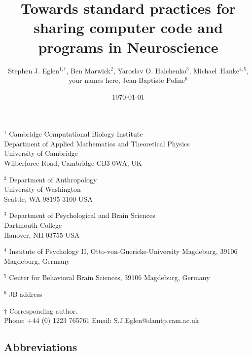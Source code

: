 \documentclass[11pt]{article}
\begin{document}
\doublespacing

\title{Towards standard practices for sharing computer code and programs in Neuroscience}

\author{Stephen J. Eglen$^{1,\dagger}$, Ben Marwick${^2}$, Yaroslav O. Halchenko${^3}$, Michael~Hanke${^{4,5}}$,\\ your names here, Jean-Baptiste Poline${^6}$}
\date{\today}
\maketitle

\noindent $^{1}$ 
Cambridge Computational Biology Institute\\
Department of Applied Mathematics and Theoretical Physics\\
University of Cambridge\\
Wilberforce Road, Cambridge CB3 0WA, UK
\vspace*{2mm}

\noindent $^{2}$ 
Department of Anthropology\\
University of Washington\\
Seattle, WA 98195-3100 USA 
\vspace*{2mm}

\noindent $^{3}$
Department of Psychological and Brain Sciences\\
Dartmouth College\\
Hanover, NH 03755 USA
\vspace*{2mm}

\noindent $^{4}$
Institute of Psychology II, Otto-von-Guericke-University Magdeburg, 39106 Magdeburg, Germany
\vspace*{2mm}

\noindent $^{5}$
Center for Behavioral Brain Sciences, 39106 Magdeburg, Germany
\vspace*{2mm}

\noindent $^6$ JB address

\vspace*{2mm}


\noindent $\dagger$
Corresponding author.\\
\noindent Phone: +44 (0) 1223 765761
\noindent Email: S.J.Eglen@damtp.cam.ac.uk



\vspace*{2cm}
\subsection*{Abbreviations}
\begin{tabular}{ll}
\end{tabular}
\end{document}
